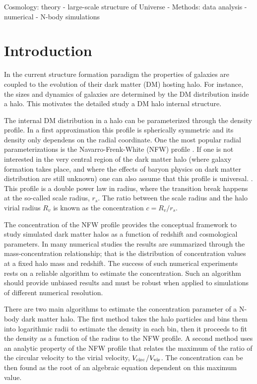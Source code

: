 \documentclass[a4,useAMS,usenatbib,usegraphicx]{mn2e}
\begin{document}
\begin{keywords}
Cosmology: theory - large-scale structure of Universe -
Methods: data analysis - numerical - N-body simulations
\end{keywords}


\section{Introduction}
\label{sec:introduction}
In the current structure formation paradigm the properties of galaxies
are coupled to the evolution of their dark matter (DM) hosting halo.
For instance, the sizes and dynamics of galaxies are determined by
the DM distribution inside a halo. This motivates the detailed study
a DM halo internal structure. 

The internal DM distribution in a halo can be parameterized through the density
profile.  
In a first approximation this profile is spherically symmetric and
its density only dependens on the radial coordinate. 
One the most popular radial parameterizations is the
Navarro-Frenk-White (NFW) profile 
\citep{NFW}.   
If one is not interested in the very central region of the
dark matter halo (where galaxy formation takes place, and where the
effects of baryon physics on dark matter distribution are still 
unknown) one can also assume that this profile is universal.
\citep{Navarro2010}.  
 This profile is a double power law in radius, where the transition
break happens at the so-called scale radius, $r_s$.  
The ratio between the scale radius and the halo virial radius $R_v$ is
known as the concentration $c=R_v/r_s$. 


The concentration of the NFW profile provides the conceptual
framework to study simulated dark matter halos as a function of
redshift and cosmological parameters.
In many numerical studies 
\citep{Neto2007,Maccio2008,Duffy2008,Munoz2011,Prada2012,Ludlow2014} 
the results are summarized through the
mass-concentration relationship; that is the distribution of
concentration values at a fixed halo mass and redshift.
The success of such numerical experiments rests on a
reliable algorithm to estimate the concentration. 
Such an algorithm should provide unbiased results and must be robust
when applied to simulations of different numerical resolution.  

There are two main algorithms to estimate the concentration parameter
of a N-body dark matter halo. 
The first method takes the halo particles and bins them into
logarithmic radii to estimate the density in each bin, then it 
proceeds to fit the density as a function of the radius to the NFW
profile.  
A second method uses an analytic property of the NFW profile
that relates the maximum of the ratio of the circular velocity to the
virial velocity, $V_{\rm circ}$/$V_{\rm vir}$.  The concentration can
be then found as the root of an algebraic equation dependent on this
maximum value.  
\end{document}
